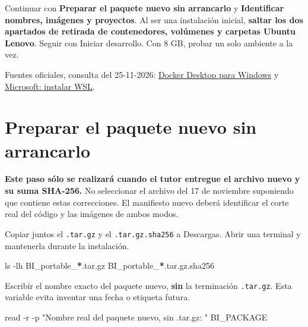 \documentclass[
  spanish,
  10pt,
  a4paper,
]{article}
\newenvironment{Shaded}{}{}
\newcommand{\AttributeTok}[1]{#1}
\newcommand{\BuiltInTok}[1]{#1}
\newcommand{\FunctionTok}[1]{#1}
\newcommand{\NormalTok}[1]{#1}
\newcommand{\PreprocessorTok}[1]{\textbf{#1}}
\newcommand{\StringTok}[1]{#1}
\newcommand{\VariableTok}[1]{#1}
\renewenvironment{Shaded}{\begin{snugshade}}{\end{snugshade}}%
\begin{document}
Continuar con \textbf{Preparar el paquete nuevo sin arrancarlo} y
\textbf{Identificar nombres, imágenes y proyectos}. Al ser una
instalación inicial, \textbf{saltar los dos apartados de retirada de
contenedores, volúmenes y carpetas Ubuntu Lenovo}. Seguir con Iniciar
desarrollo. Con 8 GB, probar un solo ambiente a la vez.

Fuentes oficiales, consulta del 25-11-2026:
\href{https://docs.docker.com/desktop/setup/install/windows-install/}{Docker
Desktop para Windows} y
\href{https://learn.microsoft.com/en-us/windows/wsl/install}{Microsoft:
instalar WSL}.

\clearpage

\section{Preparar el paquete nuevo sin
arrancarlo}\label{preparar-el-paquete-nuevo-sin-arrancarlo}

\textbf{Este paso sólo se realizará cuando el tutor entregue el archivo
nuevo y su suma SHA-256.} No seleccionar el archivo del 17 de noviembre
suponiendo que contiene estas correcciones. El manifiesto nuevo deberá
identificar el corte real del código y las imágenes de ambos modos.

Copiar juntos el \texttt{.tar.gz} y el \texttt{.tar.gz.sha256} a
Descargas. Abrir una terminal y mantenerla durante la instalación.

\begin{Shaded}
\end{Shaded}

\begin{Shaded}
\begin{Highlighting}[]
\FunctionTok{ls} \AttributeTok{{-}lh}\NormalTok{ BI\_portable\_}\PreprocessorTok{*}\NormalTok{.tar.gz BI\_portable\_}\PreprocessorTok{*}\NormalTok{.tar.gz.sha256}
\end{Highlighting}
\end{Shaded}

Escribir el nombre exacto del paquete nuevo, \textbf{sin} la terminación
\texttt{.tar.gz}. Esta variable evita inventar una fecha o etiqueta
futura.

\begin{Shaded}
\begin{Highlighting}[]
\BuiltInTok{read} \AttributeTok{{-}r} \AttributeTok{{-}p} \StringTok{"Nombre real del paquete nuevo, sin .tar.gz: "} \VariableTok{BI\_PACKAGE}
\end{Highlighting}
\end{Shaded}
\end{document}
